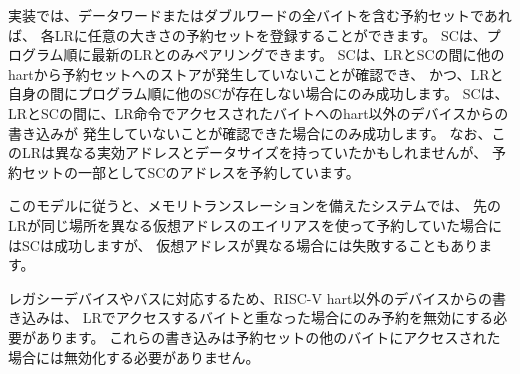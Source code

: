 実装では、データワードまたはダブルワードの全バイトを含む予約セットであれば、
各LRに任意の大きさの予約セットを登録することができます。
SCは、プログラム順に最新のLRとのみペアリングできます。
SCは、LRとSCの間に他のhartから予約セットへのストアが発生していないことが確認でき、
かつ、LRと自身の間にプログラム順に他のSCが存在しない場合にのみ成功します。
SCは、LRとSCの間に、LR命令でアクセスされたバイトへのhart以外のデバイスからの書き込みが
発生していないことが確認できた場合にのみ成功します。
なお、このLRは異なる実効アドレスとデータサイズを持っていたかもしれませんが、
予約セットの一部としてSCのアドレスを予約しています。

\begin{commentary}
\begin{comment}
Following this model, in systems with memory translation, an SC is allowed to
succeed if the earlier LR reserved the same location using an alias with
a different virtual address, but is also allowed to fail if the virtual
address is different.
\end{comment}
このモデルに従うと、メモリトランスレーションを備えたシステムでは、
先のLRが同じ場所を異なる仮想アドレスのエイリアスを使って予約していた場合にはSCは成功しますが、
仮想アドレスが異なる場合には失敗することもあります。
\end{commentary}
\begin{commentary}
\begin{comment}
To accommodate legacy devices and buses, writes from devices other than RISC-V
harts are only required to invalidate reservations when they overlap the bytes
accessed by the LR.  These writes are not required to invalidate the
reservation when they access other bytes in the reservation set.
\end{comment}
レガシーデバイスやバスに対応するため、RISC-V hart以外のデバイスからの書き込みは、
LRでアクセスするバイトと重なった場合にのみ予約を無効にする必要があります。
これらの書き込みは予約セットの他のバイトにアクセスされた場合には無効化する必要がありません。
\end{commentary}

\begin{comment}
The SC must fail if the address is not within the reservation set of the most
recent LR in program order.
The SC must fail if a store to the reservation set from another hart can be
observed to occur between the LR and SC.
The SC must fail if a write from some other device to the bytes accessed by
the LR can be observed to occur between the LR and SC.
(If such a device writes the reservation set but does not write the bytes
accessed by the LR, the SC may or may not fail.)
An SC must fail if there is another SC (to any address) between the LR and the
SC in program order.
The precise statement of the atomicity requirements for successful LR/SC
sequences is defined by the Atomicity Axiom in Section~\ref{sec:rvwmo}.
\end{comment}

